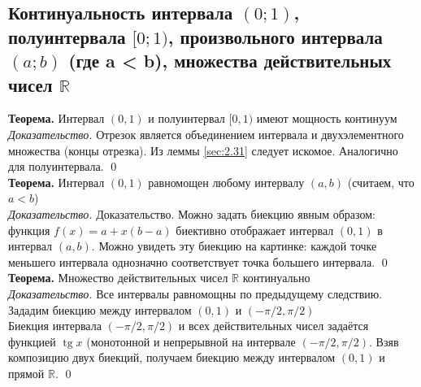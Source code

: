 \documentclass[a4paper]{article}
\begin{document}
\subsection{Континуальность интервала $(0; 1)$, полуинтервала $[0; 1)$, произвольного интервала $(a; b)$ (где a < b), множества действительных чисел $\mathbb{R}$}
\textbf{Теорема.} Интервал $(0,1)$ и полуинтервал $[0,1)$ имеют мощность континуум\\[2mm]
\textit{Доказательство.} Отрезок является объединением интервала и двухэлементного множества (концы отрезка). Из леммы \ref{sec:2.31} следует искомое. Аналогично для полуинтервала. \qed\\[2mm]
\textbf{Теорема.} Интервал $(0,1)$ равномощен любому интервалу $(a, b)$ (считаем, что $a<b$)\\[2mm]
\textit{Доказательство.} Доказательство. Можно задать биекцию явным образом: функция $f(x)=a+x(b-a)$ биективно отображает интервал $(0,1)$ в интервал $(a, b)$. Можно увидеть эту биекцию на картинке: каждой точке меньшего интервала однозначно соответствует точка большего интервала. \qed\\[2mm]
\textbf{Теорема.} Множество действительных чисел $\mathbb{R}$ континуально\\[2mm]
\textit{Доказательство.} Все интервалы равномощны по предыдущему следствию. Зададим биекцию между интервалом $(0,1)$ и $(-\pi / 2, \pi / 2)$\\[2mm]
 Биекция интервала $(-\pi / 2, \pi / 2)$ и всех действительных чисел задаётся функцией $\operatorname{tg} x$ (монотонной и непрерывной на интервале $(-\pi / 2, \pi / 2)$. Взяв композицию двух биекций, получаем биекцию между интервалом $(0,1)$ и прямой $\mathbb{R}$. \qed
\end{document}
